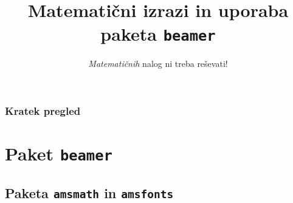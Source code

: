 \documentclass{beamer}
\begin{document}
\title{Matematični izrazi in uporaba paketa \texttt{beamer}}
\subtitle{\emph{Matematičnih} nalog ni treba reševati!}
\date{}

\begin{frame}
    \titlepage
\end{frame}


\begin{frame}
    \frametitle{Kratek pregled}
    \tableofcontents
\end{frame}



\section{Paket \texttt{beamer}}

\begin{frame}
    
\end{frame}


\begin{frame}
    \section{Paketa \texttt{amsmath} in \texttt{amsfonts}}
\end{frame}
\end{document}
